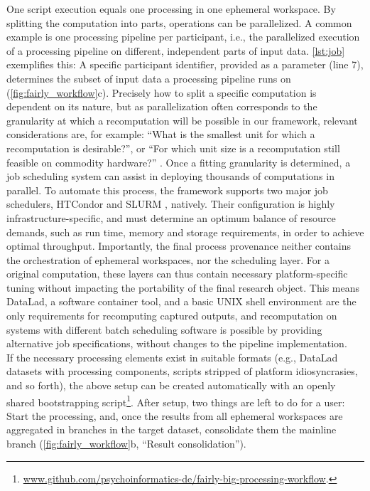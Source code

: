 One script execution equals one processing in one ephemeral workspace.
By splitting the computation into parts, operations can be parallelized.
A common example is one processing pipeline per participant, i.e., the parallelized execution of a processing pipeline on different, independent parts of input data.
\cref{lst:job} exemplifies this: A specific participant identifier, provided as a parameter (line 7), determines the subset of input data a processing pipeline runs on (\cref{fig:fairly_workflow}c).
Precisely how to split a specific computation is dependent on its nature, but as parallelization often corresponds to the granularity at which a recomputation will be possible in our framework, relevant considerations are, for example: ``What is the smallest unit for which a recomputation is desirable?'', or ``For which unit size is a recomputation still feasible on commodity hardware?'' \citep{wagner2022fairly}.
Once a fitting granularity is determined, a job scheduling system can assist in deploying thousands of computations in parallel.
To automate this process, the framework supports two major job schedulers, HTCondor \citep{thain2005distributed} and SLURM \citep{yoo2003slurm}, natively.
Their configuration is highly infrastructure-specific, and must determine an optimum balance of resource demands, such as run time, memory and storage requirements, in order to achieve optimal throughput.
Importantly, the final process provenance neither contains the orchestration of ephemeral workspaces, nor the scheduling layer.
For a original computation, these layers can thus contain necessary platform-specific tuning without impacting the portability of the final research object.
This means DataLad, a software container tool, and a basic UNIX shell environment are the only requirements for recomputing captured outputs, and recomputation on systems with different batch scheduling software is possible by providing alternative job specifications, without changes to the pipeline implementation.\\
If the necessary processing elements exist in suitable formats (e.g., DataLad datasets with processing components, scripts stripped of platform idiosyncrasies, and so forth), the above setup can be created automatically with an openly shared bootstrapping script\footnote{\url{www.github.com/psychoinformatics-de/fairly-big-processing-workflow}.}.
After setup, two things are left to do for a user:
Start the processing, and, once the results from all ephemeral workspaces are aggregated in branches in the target dataset, consolidate them the mainline branch (\cref{fig:fairly_workflow}b, ``Result consolidation'').
